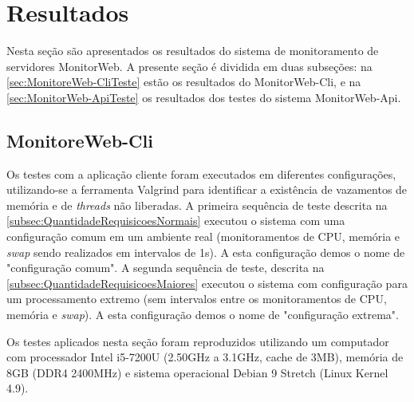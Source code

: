 
\chapter{Resultados} \label{cap:Resultados}

Nesta seção são apresentados os resultados do sistema de monitoramento de servidores MonitorWeb. A presente seção é dividida em duas subseções: na \autoref{sec:MonitoreWeb-CliTeste} estão os resultados do MonitorWeb-Cli, e na \autoref{sec:MonitorWeb-ApiTeste} os resultados dos testes do sistema MonitorWeb-Api.


\section{MonitoreWeb-Cli} \label{sec:MonitoreWeb-CliTeste}

Os testes com a aplicação cliente foram executados em diferentes configurações, utilizando-se a ferramenta Valgrind para identificar a existência de vazamentos de memória e de \textit{threads} não liberadas. A primeira sequência de teste descrita na \autoref{subsec:QuantidadeRequisicoesNormais} executou o sistema com uma configuração comum em um ambiente real (monitoramentos de CPU, memória e \textit{swap} sendo realizados em intervalos de 1s). A esta configuração demos o nome de "configuração comum". A segunda sequência de teste, descrita na \autoref{subsec:QuantidadeRequisicoesMaiores} executou o sistema com configuração para um processamento extremo (sem intervalos entre os monitoramentos de CPU, memória e \textit{swap}). A esta configuração demos o nome de "configuração extrema". 

Os testes aplicados nesta seção foram reproduzidos utilizando um computador com processador Intel i5-7200U (2.50GHz a 3.1GHz, cache de 3MB), memória de 8GB (DDR4 2400MHz) e sistema operacional Debian 9 Stretch (Linux Kernel 4.9).

